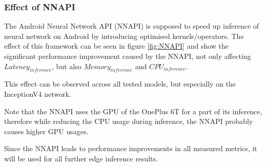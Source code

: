 \subsubsection{Effect of NNAPI}
The Android Neural Network API (NNAPI) is supposed to speed up inference of neural network on Android by introducing optimised kernels/operators. 
The effect of this framework can be seen in figure \ref{fig:NNAPI} and show the significant performance improvement caused by the NNAPI, not only affecting $Latency_{inference}$, but also $Memory_{inference}$ and $CPU_{inference}$.

This effect can be observed across all tested models, but especially on the InceptionV4 network.

Note that the NNAPI uses the GPU of the OnePlus 6T for a part of its inference, therefore while reducing the CPU usage during inference, the NNAPI probably causes higher GPU usages.

Since the NNAPI leads to performance improvements in all measured metrics, it will be used for all further edge inference results.

